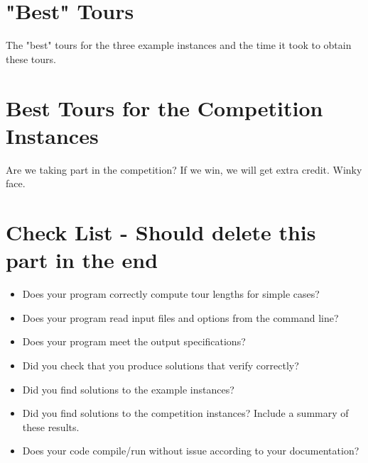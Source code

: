 \documentclass[11pt,letterpaper]{article}
\begin{document}
\section*{"Best" Tours}
The "best" tours for the three example instances and the time it took to obtain these tours.

\section*{Best Tours for the Competition Instances}
Are we taking part in the competition? If we win, we will get extra credit. Winky face.

\section*{Check List - Should delete this part in the end}
\begin{itemize}
	\item Does your program correctly compute tour lengths for simple cases?
	\item Does your program read input files and options from the command line?
	\item Does your program meet the output specifications?
	\item Did you check that you produce solutions that verify correctly?
	\item Did you find solutions to the example instances?
	\item Did you find solutions to the competition instances? Include a summary of these results.
	\item Does your code compile/run without issue according to your documentation?
\end{itemize}
\end{document}
